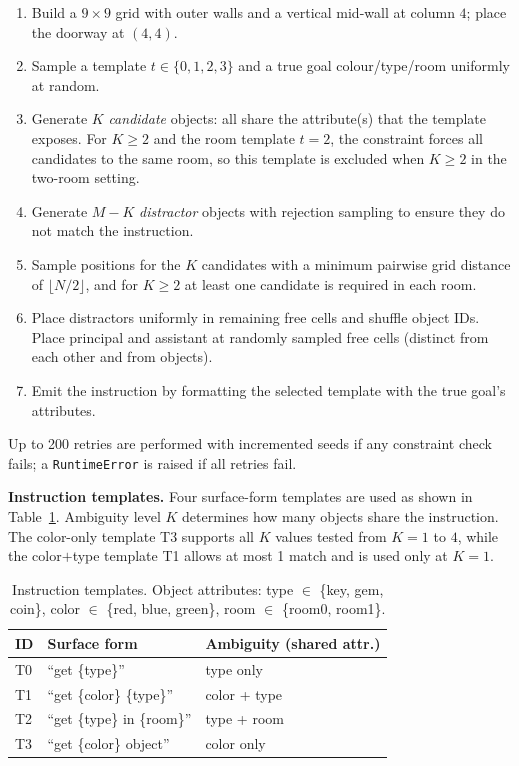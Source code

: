 \documentclass[10pt,twocolumn]{article}
\begin{document}
\begin{enumerate}
\item Build a $9{\times}9$ grid with outer walls and a vertical mid-wall at column $4$; place the doorway at $(4,4)$.
\item Sample a template $t \in \{0,1,2,3\}$ and a true goal colour/type/room uniformly at random.
\item Generate $K$ \emph{candidate} objects: all share the attribute(s) that the template exposes. For $K{\geq}2$ and the room template $t{=}2$, the constraint forces all candidates to the same room, so this template is excluded when $K{\geq}2$ in the two-room setting.
\item Generate $M{-}K$ \emph{distractor} objects with rejection sampling to ensure they do not match the instruction.
\item Sample positions for the $K$ candidates with a minimum pairwise grid distance of $\lfloor N/2 \rfloor$, and for $K{\geq}2$ at least one candidate is required in each room.
\item Place distractors uniformly in remaining free cells and shuffle object IDs. Place principal and assistant at randomly sampled free cells (distinct from each other and from objects).
\item Emit the instruction by formatting the selected template with the true goal's attributes.
\end{enumerate}
Up to 200 retries are performed with incremented seeds if any constraint check fails; a \texttt{RuntimeError} is raised if all retries fail.

\textbf{Instruction templates.}
Four surface-form templates are used as shown in Table~\ref{tab:templates}. Ambiguity level $K$ determines how many objects share the instruction. The color-only template T3 supports all $K$ values tested from $K{=}1$ to $4$, while the color$+$type template T1 allows at most 1 match and is used only at $K{=}1$.

\begin{table}[h]
\centering
\caption{Instruction templates. Object attributes: type $\in$ \{key, gem, coin\}, color $\in$ \{red, blue, green\}, room $\in$ \{room0, room1\}.}
\label{tab:templates}
\small
\begin{tabular}{llp{2.8cm}}
\toprule
ID & Surface form & Ambiguity (shared attr.) \\
\midrule
T0 & ``get \{type\}'' & type only \\
T1 & ``get \{color\} \{type\}'' & color + type \\
T2 & ``get \{type\} in \{room\}'' & type + room \\
T3 & ``get \{color\} object'' & color only \\
\bottomrule
\end{tabular}
\end{table}
\end{document}
